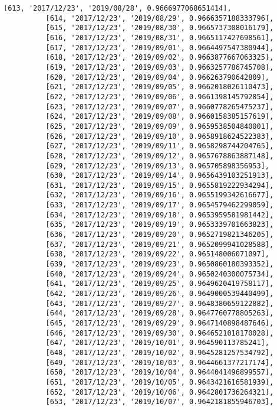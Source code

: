 \documentclass[11pt]{article}
\begin{document}
\begin{Verbatim}[commandchars=\\\{\}]
          [613, '2017/12/23', '2019/08/28', 0.9666977068651414],
          [614, '2017/12/23', '2019/08/29', 0.9666357188333796],
          [615, '2017/12/23', '2019/08/30', 0.9665737308016179],
          [616, '2017/12/23', '2019/08/31', 0.9665117427698561],
          [617, '2017/12/23', '2019/09/01', 0.9664497547380944],
          [618, '2017/12/23', '2019/09/02', 0.9663877667063325],
          [619, '2017/12/23', '2019/09/03', 0.9663257786745708],
          [620, '2017/12/23', '2019/09/04', 0.966263790642809],
          [621, '2017/12/23', '2019/09/05', 0.9662018026110473],
          [622, '2017/12/23', '2019/09/06', 0.9661398145792854],
          [623, '2017/12/23', '2019/09/07', 0.9660778265475237],
          [624, '2017/12/23', '2019/09/08', 0.9660158385157619],
          [625, '2017/12/23', '2019/09/09', 0.9659538504840001],
          [626, '2017/12/23', '2019/09/10', 0.9658918624522383],
          [627, '2017/12/23', '2019/09/11', 0.9658298744204765],
          [628, '2017/12/23', '2019/09/12', 0.9657678863887148],
          [629, '2017/12/23', '2019/09/13', 0.965705898356953],
          [630, '2017/12/23', '2019/09/14', 0.9656439103251913],
          [631, '2017/12/23', '2019/09/15', 0.9655819222934294],
          [632, '2017/12/23', '2019/09/16', 0.9655199342616677],
          [633, '2017/12/23', '2019/09/17', 0.9654579462299059],
          [634, '2017/12/23', '2019/09/18', 0.9653959581981442],
          [635, '2017/12/23', '2019/09/19', 0.9653339701663823],
          [636, '2017/12/23', '2019/09/20', 0.9652719821346205],
          [637, '2017/12/23', '2019/09/21', 0.9652099941028588],
          [638, '2017/12/23', '2019/09/22', 0.965148006071097],
          [639, '2017/12/23', '2019/09/23', 0.9650860180393352],
          [640, '2017/12/23', '2019/09/24', 0.9650240300075734],
          [641, '2017/12/23', '2019/09/25', 0.9649620419758117],
          [642, '2017/12/23', '2019/09/26', 0.9649000539440499],
          [643, '2017/12/23', '2019/09/27', 0.9648380659122882],
          [644, '2017/12/23', '2019/09/28', 0.9647760778805263],
          [645, '2017/12/23', '2019/09/29', 0.9647140898487646],
          [646, '2017/12/23', '2019/09/30', 0.9646521018170028],
          [647, '2017/12/23', '2019/10/01', 0.964590113785241],
          [648, '2017/12/23', '2019/10/02', 0.9645281257534792],
          [649, '2017/12/23', '2019/10/03', 0.9644661377217174],
          [650, '2017/12/23', '2019/10/04', 0.9644041496899557],
          [651, '2017/12/23', '2019/10/05', 0.9643421616581939],
          [652, '2017/12/23', '2019/10/06', 0.9642801736264321],
          [653, '2017/12/23', '2019/10/07', 0.9642181855946703],

\end{Verbatim}
\end{document}

